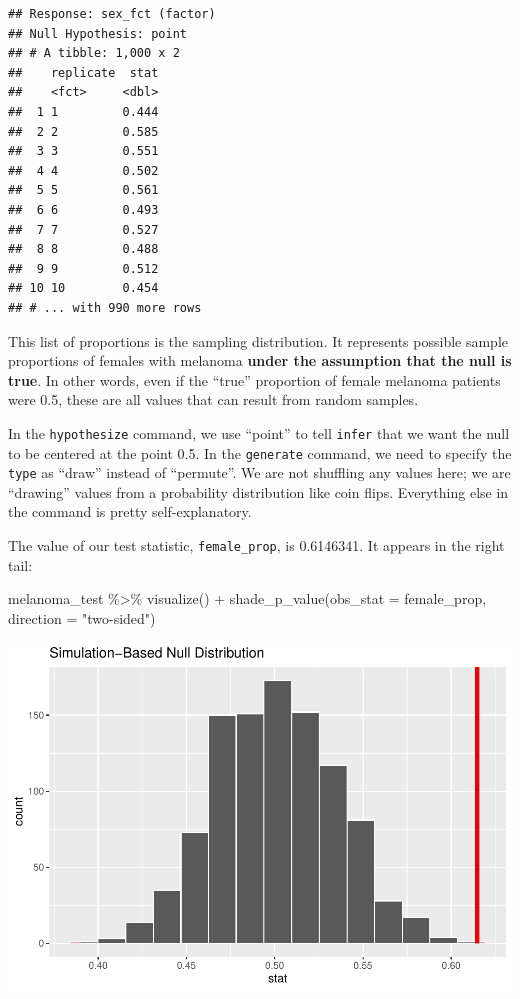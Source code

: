 \documentclass[
]{book}
\newenvironment{Shaded}{\begin{snugshade}}{\end{snugshade}}
\newcommand{\AttributeTok}[1]{\textcolor[rgb]{0.77,0.63,0.00}{#1}}
\newcommand{\FunctionTok}[1]{\textcolor[rgb]{0.00,0.00,0.00}{#1}}
\newcommand{\NormalTok}[1]{#1}
\newcommand{\SpecialCharTok}[1]{\textcolor[rgb]{0.00,0.00,0.00}{#1}}
\newcommand{\StringTok}[1]{\textcolor[rgb]{0.31,0.60,0.02}{#1}}
\begin{document}
\begin{verbatim}
## Response: sex_fct (factor)
## Null Hypothesis: point
## # A tibble: 1,000 x 2
##    replicate  stat
##    <fct>     <dbl>
##  1 1         0.444
##  2 2         0.585
##  3 3         0.551
##  4 4         0.502
##  5 5         0.561
##  6 6         0.493
##  7 7         0.527
##  8 8         0.488
##  9 9         0.512
## 10 10        0.454
## # ... with 990 more rows
\end{verbatim}

This list of proportions is the sampling distribution. It represents possible sample proportions of females with melanoma \textbf{under the assumption that the null is true}. In other words, even if the ``true'' proportion of female melanoma patients were 0.5, these are all values that can result from random samples.

In the \texttt{hypothesize} command, we use ``point'' to tell \texttt{infer} that we want the null to be centered at the point 0.5. In the \texttt{generate} command, we need to specify the \texttt{type} as ``draw'' instead of ``permute''. We are not shuffling any values here; we are ``drawing'' values from a probability distribution like coin flips. Everything else in the command is pretty self-explanatory.

The value of our test statistic, \texttt{female\_prop}, is 0.6146341. It appears in the right tail:

\begin{Shaded}
\begin{Highlighting}[]
\NormalTok{melanoma\_test }\SpecialCharTok{\%\textgreater{}\%}
    \FunctionTok{visualize}\NormalTok{() }\SpecialCharTok{+}
    \FunctionTok{shade\_p\_value}\NormalTok{(}\AttributeTok{obs\_stat =}\NormalTok{ female\_prop, }\AttributeTok{direction =} \StringTok{"two{-}sided"}\NormalTok{)}
\end{Highlighting}
\end{Shaded}

\includegraphics{intro_stats_files/figure-latex/unnamed-chunk-299-1.pdf}
\end{document}
